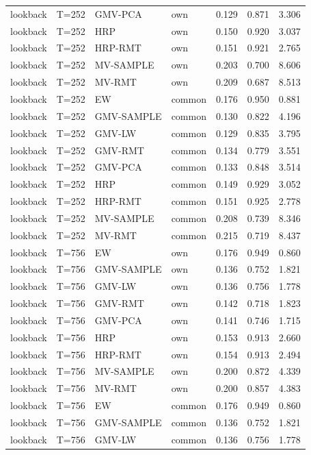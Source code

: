 \begin{table}[t]
{\begin{tabular}{llllrrr}
lookback & T=252 & GMV-PCA & own & 0.129 & 0.871 & 3.306 \\
lookback & T=252 & HRP & own & 0.150 & 0.920 & 3.037 \\
lookback & T=252 & HRP-RMT & own & 0.151 & 0.921 & 2.765 \\
lookback & T=252 & MV-SAMPLE & own & 0.203 & 0.700 & 8.606 \\
lookback & T=252 & MV-RMT & own & 0.209 & 0.687 & 8.513 \\
lookback & T=252 & EW & common & 0.176 & 0.950 & 0.881 \\
lookback & T=252 & GMV-SAMPLE & common & 0.130 & 0.822 & 4.196 \\
lookback & T=252 & GMV-LW & common & 0.129 & 0.835 & 3.795 \\
lookback & T=252 & GMV-RMT & common & 0.134 & 0.779 & 3.551 \\
lookback & T=252 & GMV-PCA & common & 0.133 & 0.848 & 3.514 \\
lookback & T=252 & HRP & common & 0.149 & 0.929 & 3.052 \\
lookback & T=252 & HRP-RMT & common & 0.151 & 0.925 & 2.778 \\
lookback & T=252 & MV-SAMPLE & common & 0.208 & 0.739 & 8.346 \\
lookback & T=252 & MV-RMT & common & 0.215 & 0.719 & 8.437 \\
lookback & T=756 & EW & own & 0.176 & 0.949 & 0.860 \\
lookback & T=756 & GMV-SAMPLE & own & 0.136 & 0.752 & 1.821 \\
lookback & T=756 & GMV-LW & own & 0.136 & 0.756 & 1.778 \\
lookback & T=756 & GMV-RMT & own & 0.142 & 0.718 & 1.823 \\
lookback & T=756 & GMV-PCA & own & 0.141 & 0.746 & 1.715 \\
lookback & T=756 & HRP & own & 0.153 & 0.913 & 2.660 \\
lookback & T=756 & HRP-RMT & own & 0.154 & 0.913 & 2.494 \\
lookback & T=756 & MV-SAMPLE & own & 0.200 & 0.872 & 4.339 \\
lookback & T=756 & MV-RMT & own & 0.200 & 0.857 & 4.383 \\
lookback & T=756 & EW & common & 0.176 & 0.949 & 0.860 \\
lookback & T=756 & GMV-SAMPLE & common & 0.136 & 0.752 & 1.821 \\
lookback & T=756 & GMV-LW & common & 0.136 & 0.756 & 1.778 \\

\end{tabular}}
\end{table}

